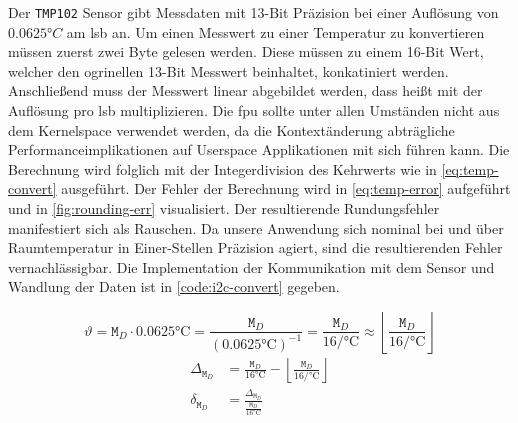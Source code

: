 Der \texttt{TMP102} Sensor gibt Messdaten mit 13-Bit Präzision bei einer Auflösung von $0.0625\si{\degree C}$ am \gls{lsb} an.
Um einen Messwert zu einer Temperatur zu konvertieren müssen zuerst zwei Byte gelesen werden.
Diese müssen zu einem 16-Bit Wert, welcher den ogrinellen 13-Bit Messwert beinhaltet, konkatiniert werden.
Anschlie{\ss}end muss der Messwert linear abgebildet werden, dass hei{\ss}t mit der Auflösung pro \gls{lsb} multiplizieren.
Die \gls{fpu} sollte unter allen Umständen nicht aus dem Kernelspace verwendet werden,
da die Kontextänderung abträgliche Performanceimplikationen auf Userspace Applikationen mit sich führen kann.
Die Berechnung wird folglich mit der Integerdivision des Kehrwerts wie in \autoref{eq:temp-convert} ausgeführt.
Der Fehler der Berechnung wird in \autoref{eq:temp-error} aufgeführt und in \autoref{fig:rounding-err} visualisiert.
Der resultierende Rundungsfehler manifestiert sich als Rauschen.
Da unsere Anwendung sich nominal bei und über Raumtemperatur in Einer-Stellen Präzision agiert, sind die resultierenden Fehler vernachlässigbar.
Die Implementation der Kommunikation mit dem Sensor und Wandlung der Daten ist in \autoref{code:i2c-convert} gegeben.

\begin{equation}
    \vartheta = \texttt{M}_D \cdot 0.0625\si{\celsius} = \frac{\texttt{M}_D}{\left(0.0625\si{\celsius}\right)^{-1}} = \frac{\texttt{M}_D}{16\si{\per\celsius}} \approx \left\lfloor\frac{\texttt{M}_D}{16\si{\per\celsius}}\right\rfloor
    \label{eq:temp-convert}
\end{equation}
\begin{equation}
    \begin{aligned}
        \Delta_{\texttt{M}_D} &= \frac{\texttt{M}_D}{16\si{\celsius}} - \left\lfloor\frac{\texttt{M}_D}{16\si{\per\celsius}}\right\rfloor \\[2ex]
        \delta_{\texttt{M}_D} &= \frac{\Delta_{\texttt{M}_D}}{\frac{\texttt{M}_D}{16\si{\celsius}} }\\[2ex]
    \end{aligned}
    \label{eq:temp-error}
\end{equation}



